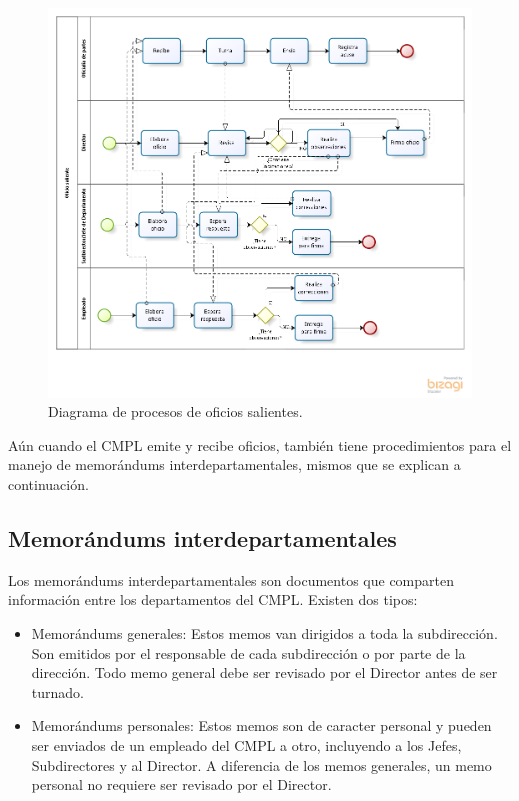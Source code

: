 	\begin{figure}[htbp!]
		\centering
			\includegraphics[width=1.2\textwidth]{images/antecedentes/oficiosaliente.png}
		\caption{Diagrama de procesos de oficios salientes.}
		\label{fig:OficiosSalientes}
	\end{figure}

	Aún cuando el CMPL emite y recibe oficios, también tiene procedimientos para el manejo de memorándums interdepartamentales, mismos que se explican a continuación.

\subsection{Memorándums interdepartamentales}
	 Los memorándums interdepartamentales son documentos que comparten información entre los departamentos del CMPL. Existen dos tipos:\\
	
	\begin{itemize}
		\item Memorándums generales: Estos memos van dirigidos a toda la subdirección. Son emitidos por el responsable de cada subdirección o por parte de la dirección. Todo memo general debe ser revisado por el Director antes de ser turnado.
		\item Memorándums personales: Estos memos son de caracter personal y pueden ser enviados de un empleado del CMPL a otro, incluyendo a los Jefes, Subdirectores y al Director. A diferencia de los memos generales, un memo personal no requiere ser revisado por el Director.
	\end{itemize}
	
